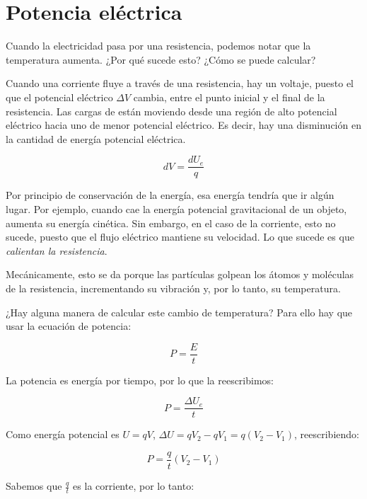 \section{Potencia eléctrica}

Cuando la electricidad pasa por una resistencia,
podemos notar que la temperatura aumenta.
¿Por qué sucede esto?
¿Cómo se puede calcular?

Cuando una corriente fluye a través de una resistencia,
hay un voltaje,
puesto el que el potencial eléctrico \(\Delta V\) cambia,
entre el punto inicial y el final de la resistencia.
Las cargas de están moviendo desde una región de alto potencial eléctrico 
hacia uno de menor potencial eléctrico.
Es decir,
hay una disminución en la cantidad de energía potencial eléctrica.

\begin{equation*}
    dV=\frac{dU_e}{q}
\end{equation*}

Por principio de conservación de la energía,
esa energía tendría que ir algún lugar.
Por ejemplo,
cuando cae la energía potencial gravitacional de un objeto,
aumenta su energía cinética.
Sin embargo,
en el caso de la corriente,
esto no sucede,
puesto que el flujo eléctrico mantiene su velocidad.
Lo que sucede es que \textit{calientan la resistencia}.

Mecánicamente,
esto se da porque las partículas golpean los átomos y moléculas de la 
resistencia, incrementando su vibración y,
por lo tanto,
su temperatura.

¿Hay alguna manera de calcular este cambio de temperatura?
Para ello hay que usar la ecuación de potencia:

\begin{equation*}
    P=\frac{E}{t}
\end{equation*}

La potencia es energía por tiempo,
por lo que la reescribimos:

\begin{equation*}
    P=\frac{\Delta U_e}{t}
\end{equation*}

Como energía potencial es \(U=qV\),
\(\Delta U = qV_2 - qV_1 = q(V_2 - V_1)\),
reescribiendo:

\begin{equation*}
    P = \frac{q}{t}(V_2 - V_1)
\end{equation*}

Sabemos que \(\frac{q}{t}\) es la corriente, por lo tanto:

